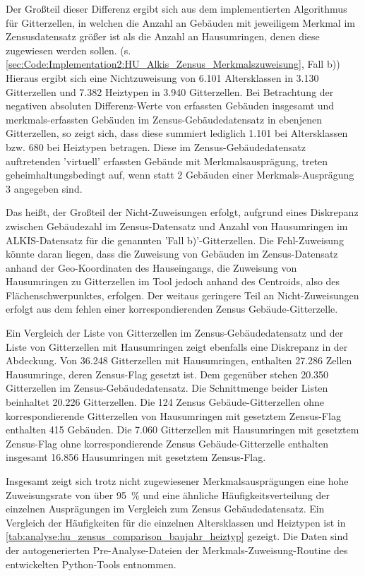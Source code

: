 		Der Großteil dieser Differenz ergibt sich aus dem implementierten Algorithmus für Gitterzellen, in welchen die Anzahl an Gebäuden mit jeweiligem Merkmal im Zensusdatensatz größer ist als die Anzahl an Hausumringen, denen diese zugewiesen werden sollen. (s. \autoref{sec:Code:Implementation2:HU_Alkis_Zensus_Merkmalszuweisung}, Fall b))
		Hieraus ergibt sich eine Nichtzuweisung von 6.101 Altersklassen in 3.130 Gitterzellen und 7.382 Heiztypen in 3.940 Gitterzellen. Bei Betrachtung der negativen absoluten Differenz-Werte von erfassten Gebäuden insgesamt und merkmals-erfassten Gebäuden im Zensus-Gebäudedatensatz in ebenjenen Gitterzellen, so zeigt sich, dass diese summiert lediglich 1.101 bei Altersklassen bzw. 680 bei Heiztypen betragen. Diese im Zensus-Gebäudedatensatz auftretenden 'virtuell' erfassten Gebäude mit Merkmalsausprägung, treten geheimhaltungsbedingt auf, wenn statt 2 Gebäuden einer Merkmals-Ausprägung 3 angegeben sind. 
		
		Das heißt, der Großteil der Nicht-Zuweisungen erfolgt, aufgrund eines Diskrepanz zwischen Gebäudezahl im Zensus-Datensatz und Anzahl von Hausumringen im ALKIS-Datensatz für die genannten 'Fall b)'-Gitterzellen. Die Fehl-Zuweisung könnte daran liegen, dass die Zuweisung von Gebäuden im Zensus-Datensatz anhand der Geo-Koordinaten des Hauseingangs, die Zuweisung von Hausumringen zu Gitterzellen im Tool jedoch anhand des Centroids, also des Flächenschwerpunktes, erfolgen. Der weitaus geringere Teil an Nicht-Zuweisungen erfolgt aus dem fehlen einer korrespondierenden Zensus Gebäude-Gitterzelle.
		
		Ein Vergleich der Liste von Gitterzellen im Zensus-Gebäudedatensatz und der Liste von Gitterzellen mit Hausumringen zeigt ebenfalls eine Diskrepanz in der Abdeckung. Von 36.248 Gitterzellen mit Hausumringen, enthalten 27.286 Zellen Hausumringe, deren Zensus-Flag gesetzt ist. Dem gegenüber stehen 20.350 Gitterzellen im Zensus-Gebäudedatensatz. 
		Die Schnittmenge beider Listen beinhaltet 20.226 Gitterzellen. Die 124 Zensus Gebäude-Gitterzellen ohne korrespondierende Gitterzellen von Hausumringen mit gesetztem Zensus-Flag enthalten 415 Gebäuden. Die 7.060 Gitterzellen mit Hausumringen mit gesetztem Zensus-Flag ohne korrespondierende Zensus Gebäude-Gitterzelle enthalten insgesamt 16.856 Hausumringen mit gesetztem Zensus-Flag.

		Insgesamt zeigt sich trotz nicht zugewiesener Merkmalsausprägungen eine hohe Zuweisungsrate von über 95~\% und eine ähnliche Häufigkeitsverteilung der einzelnen Ausprägungen im Vergleich zum Zensus Gebäudedatensatz. Ein Vergleich der Häufigkeiten für die einzelnen Altersklassen und Heiztypen ist in \autoref{tab:analyse:hu_zensus_comparison_baujahr_heiztyp} gezeigt. Die Daten sind der autogenerierten Pre-Analyse-Dateien der Merkmals-Zuweisung-Routine des entwickelten Python-Tools entnommen. \\

